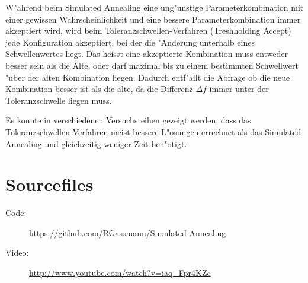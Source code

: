 W"ahrend beim Simulated Annealing eine ung"unstige
Parameterkombination mit einer gewissen Wahrscheinlichkeit und
eine bessere Parameterkombination immer akzeptiert wird, wird beim
Toleranzschwellen-Verfahren (Treshholding Accept) jede Konfiguration
akzeptiert, bei der die "Anderung unterhalb eines Schwellenwertes
liegt. Das heisst eine akzeptierte Kombination muss entweder besser
sein als die Alte, oder darf maximal bis zu einem bestimmten Schwellwert
"uber der alten Kombination liegen. Dadurch entf"allt die Abfrage ob die
neue Kombination besser ist als die alte, da die Differenz $\Delta f$
immer unter der Toleranzschwelle liegen muss.

Es konnte in verschiedenen Versuchsreihen gezeigt werden, dass das
Toleranzschwellen-Verfahren meist bessere L"osungen errechnet als das
Simulated Annealing und gleichzeitig weniger Zeit ben"otigt.

\section{Sourcefiles}
\begin{description}
	\item [Code:] \url{https://github.com/RGassmann/Simulated-Annealing}
	\item [Video:] \url{http://www.youtube.com/watch?v=iaq_Fpr4KZc}
\end{description}
